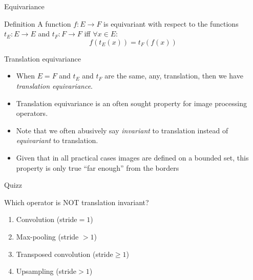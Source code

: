\documentclass[xcolor=pdftex,dvipsnames,table,mathserif]{beamer}
\begin{document}
\begin{frame}{Equivariance}

\begin{block}{Definition}
  A function $f: E \longrightarrow F$ is \alert{equivariant} with respect to the functions $t_E: E \longrightarrow E$ and $t_F: F \longrightarrow F$ iff $\forall x \in E$:
  \[
  f(t_E(x)) = t_F(f(x))
  \]
\end{block}

\end{frame}

\begin{frame}{Translation equivariance}

\begin{itemize}
  \item When $E=F$ and $t_E$ and $t_F$ are the same, any, translation, then we have \emph{translation equivariance}.
\item Translation equivariance is an often sought property for image processing operators.
\item Note that we often abusively say \emph{invariant} to translation instead of \emph{equivariant} to translation.
\item Given that in all practical cases images are defined on a bounded set, this property is only true ``far enough'' from the borders
\end{itemize}

\end{frame}


\begin{frame}{Quizz}

  \begin{quizzblock}{Which operator is NOT translation invariant?}
    \begin{enumerate}
    \item Convolution (stride$=1$)
    \item Max-pooling (stride $>1$)
    \item Transposed convolution (stride$\geq 1$)
    \item Upsampling (stride$>1$)
    \end{enumerate}
  \end{quizzblock}

\end{frame}
\end{document}
